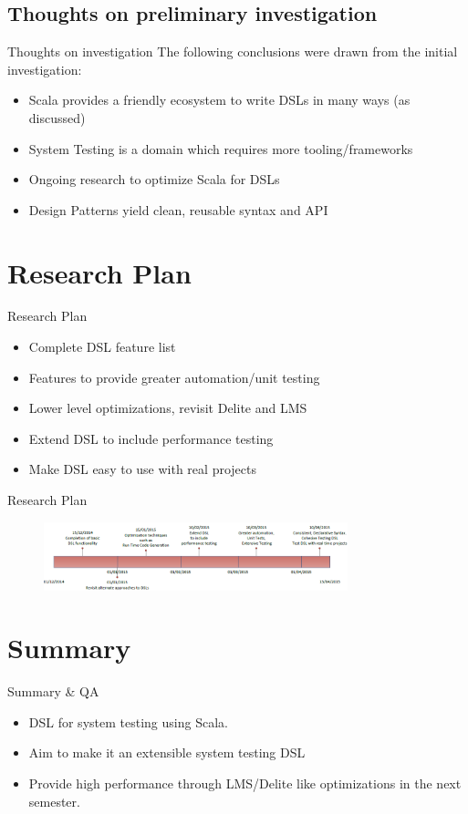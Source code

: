 \documentclass{beamer}
\begin{document}
\subsection{Thoughts on preliminary investigation}
\begin{frame}{Thoughts on investigation}
The following conclusions were drawn from the initial investigation:
\begin{itemize}
\item Scala provides a friendly ecosystem to write DSLs in many ways (as discussed)
\item System Testing is a domain which requires more tooling/frameworks
\item Ongoing research to optimize Scala for DSLs
\item Design Patterns yield clean, reusable syntax and API
\end{itemize}
\end{frame}

\section{Research Plan}

\begin{frame}{Research Plan}
\begin{itemize}
\item Complete DSL feature list
\item Features to provide greater automation/unit testing
\item Lower level optimizations, revisit Delite and LMS
\item Extend DSL to include performance testing
\item Make DSL easy to use with real projects
\end{itemize}
\end{frame}

\begin{frame}{Research Plan}
\begin{figure}[h!]
  \centering
    \includegraphics[width=333px]{figures/timeline.png}
\end{figure}
\end{frame}

\section*{Summary}

\begin{frame}{Summary \& QA}
  \begin{itemize}
  \item
     \alert{DSL for system testing} using Scala.
  \item
     Aim to make it an \alert{extensible system testing DSL}
  \item
     Provide high performance through \alert{LMS/Delite like optimizations} in the next semester.
  \end{itemize}
\end{frame}
\end{document}
